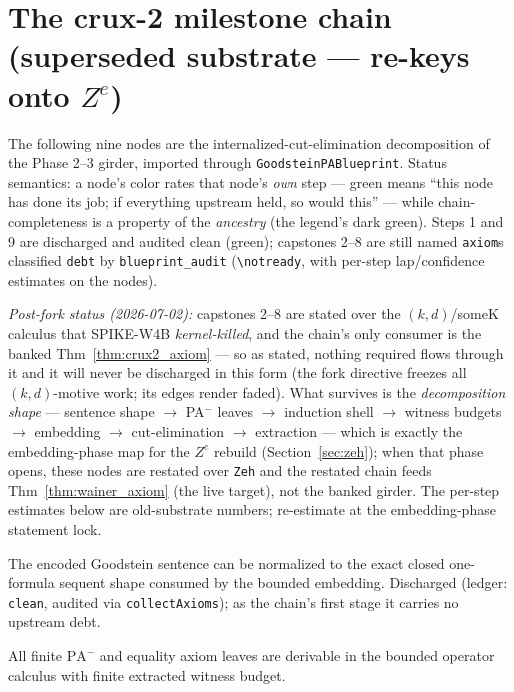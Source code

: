 \section{The crux-2 milestone chain (superseded substrate --- re-keys onto \(Z^{e}\))}

The following nine nodes are the internalized-cut-elimination decomposition of the Phase 2--3 girder,
imported through \texttt{GoodsteinPABlueprint}.  Status semantics: a node's color rates that node's
\emph{own} step --- green means ``this node has done its job; if everything upstream held, so would
this'' --- while chain-completeness is a property of the \emph{ancestry} (the legend's dark green).
Steps 1 and 9 are discharged and audited clean (green); capstones 2--8 are still named
\texttt{axiom}s classified \texttt{debt} by \texttt{blueprint\_audit}
(\texttt{\textbackslash notready}, with per-step lap/confidence estimates on the nodes).

\emph{Post-fork status (2026-07-02):} capstones 2--8 are stated over the \((k,d)\)/someK calculus
that SPIKE-W4B \emph{kernel-killed}, and the chain's only consumer is the banked
Thm~\ref{thm:crux2_axiom} --- so as stated, nothing required flows through it and it will never be
discharged in this form (the fork directive freezes all \((k,d)\)-motive work; its edges render
faded).  What survives is the \emph{decomposition shape} --- sentence shape \(\to\) PA\(^-\) leaves
\(\to\) induction shell \(\to\) witness budgets \(\to\) embedding \(\to\) cut-elimination \(\to\)
extraction --- which is exactly the embedding-phase map for the \(Z^{e}\) rebuild
(Section~\ref{sec:zeh}); when that phase opens, these nodes are restated over \texttt{Zeh} and the
restated chain feeds Thm~\ref{thm:wainer_axiom} (the live target), not the banked girder.  The
per-step estimates below are old-substrate numbers; re-estimate at the embedding-phase statement
lock.

\begin{theorem}\label{thm:pathBGoodsteinSentenceShape}
  \leanok
The encoded Goodstein sentence can be normalized to the exact closed one-formula sequent shape
consumed by the bounded embedding.  Discharged (ledger: \texttt{clean}, audited via
\texttt{collectAxioms}); as the chain's first stage it carries no upstream debt.
\end{theorem}

\begin{theorem}\label{thm:pathBPeanoMinusAxiomLeaves}
  \notready
All finite \(\mathrm{PA}^{-}\) and equality axiom leaves are derivable in the bounded operator
calculus with finite extracted witness budget.
\end{theorem}

